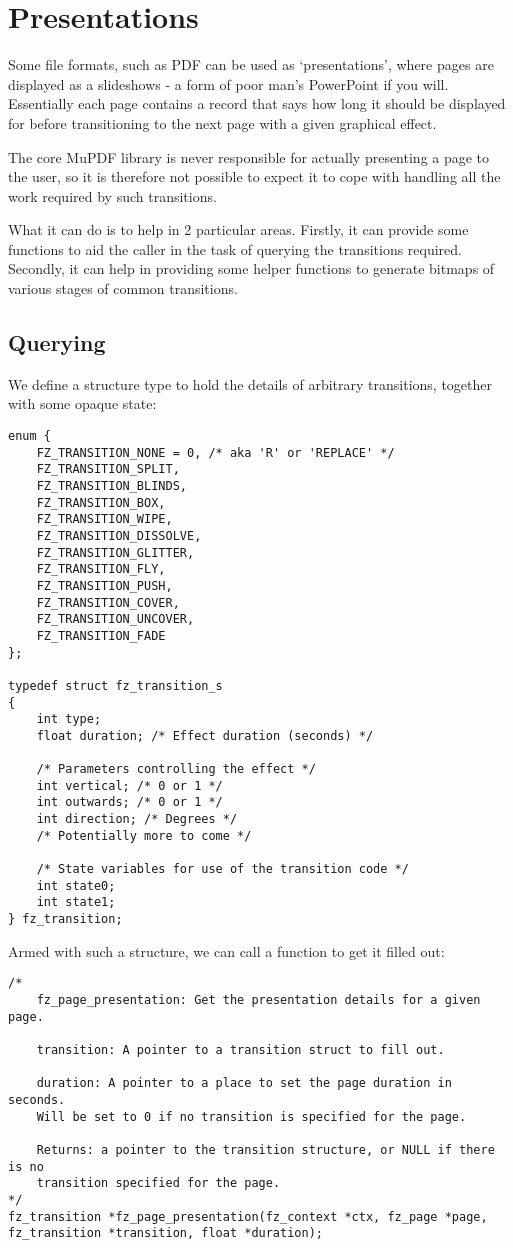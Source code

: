 \documentclass[oneside]{book}
\begin{document}
\section{Presentations}
\label{Presentations}

Some file formats, such as PDF can be used as `presentations', where pages are displayed as a slideshows - a form of poor man's PowerPoint if you will. Essentially each page contains a record that says how long it should be displayed for before transitioning to the next page with a given graphical effect.

The core MuPDF library is never responsible for actually presenting a page to the user, so it is therefore not possible to expect it to cope with handling all the work required by such transitions.

What it can do is to help in 2 particular areas. Firstly, it can provide some functions to aid the caller in the task of querying the transitions required. Secondly, it can help in providing some helper functions to generate bitmaps of various stages of common transitions.

\subsection{Querying}

We define a structure type to hold the details of arbitrary transitions, together with some opaque state:

\begin{lstlisting}
enum {
	FZ_TRANSITION_NONE = 0, /* aka 'R' or 'REPLACE' */
	FZ_TRANSITION_SPLIT,
	FZ_TRANSITION_BLINDS,
	FZ_TRANSITION_BOX,
	FZ_TRANSITION_WIPE,
	FZ_TRANSITION_DISSOLVE,
	FZ_TRANSITION_GLITTER,
	FZ_TRANSITION_FLY,
	FZ_TRANSITION_PUSH,
	FZ_TRANSITION_COVER,
	FZ_TRANSITION_UNCOVER,
	FZ_TRANSITION_FADE
};

typedef struct fz_transition_s
{
	int type;
	float duration; /* Effect duration (seconds) */

	/* Parameters controlling the effect */
	int vertical; /* 0 or 1 */
	int outwards; /* 0 or 1 */
	int direction; /* Degrees */
	/* Potentially more to come */

	/* State variables for use of the transition code */
	int state0;
	int state1;
} fz_transition;
\end{lstlisting}

Armed with such a structure, we can call a function to get it filled out:

\begin{lstlisting}
/*
	fz_page_presentation: Get the presentation details for a given page.

	transition: A pointer to a transition struct to fill out.

	duration: A pointer to a place to set the page duration in seconds.
	Will be set to 0 if no transition is specified for the page.

	Returns: a pointer to the transition structure, or NULL if there is no
	transition specified for the page.
*/
fz_transition *fz_page_presentation(fz_context *ctx, fz_page *page, fz_transition *transition, float *duration);
\end{lstlisting}
\end{document}
